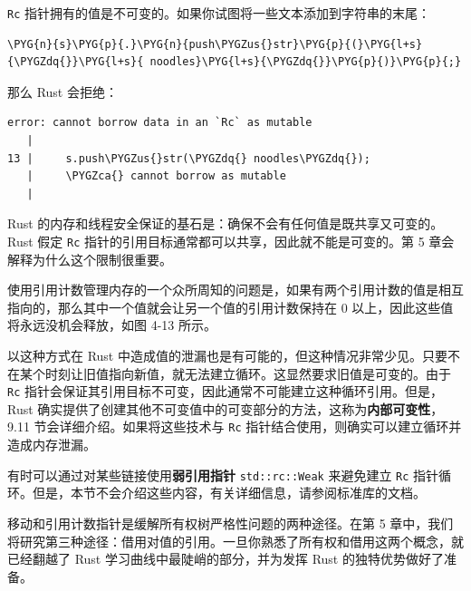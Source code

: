 \texttt{Rc} 指针拥有的值是不可变的。如果你试图将一些文本添加到字符串的末尾：

\begin{Verbatim}[commandchars=\\\{\},breaklines=true,breakanywhere=true,fontsize=\codefont,xleftmargin=17bp]
\PYG{n}{s}\PYG{p}{.}\PYG{n}{push\PYGZus{}str}\PYG{p}{(}\PYG{l+s}{\PYGZdq{}}\PYG{l+s}{ noodles}\PYG{l+s}{\PYGZdq{}}\PYG{p}{)}\PYG{p}{;}
\end{Verbatim}

那么 Rust 会拒绝：

\begin{Verbatim}[commandchars=\\\{\},breaklines=true,breakanywhere=true,fontsize=\codefont,xleftmargin=17bp]
error: cannot borrow data in an `Rc` as mutable
   |
13 |     s.push\PYGZus{}str(\PYGZdq{} noodles\PYGZdq{});
   |     \PYGZca{} cannot borrow as mutable
   |
\end{Verbatim}

Rust 的内存和线程安全保证的基石是：确保不会有任何值是既共享又可变的。Rust 假定 \texttt{Rc} 指针的引用目标通常都可以共享，因此就不能是可变的。第 5 章会解释为什么这个限制很重要。

使用引用计数管理内存的一个众所周知的问题是，如果有两个引用计数的值是相互指向的，那么其中一个值就会让另一个值的引用计数保持在 0 以上，因此这些值将永远没机会释放，如图 4-13 所示。


以这种方式在 Rust 中造成值的泄漏也是有可能的，但这种情况非常少见。只要不在某个时刻让旧值指向新值，就无法建立循环。这显然要求旧值是可变的。由于 \texttt{Rc} 指针会保证其引用目标不可变，因此通常不可能建立这种循环引用。但是，Rust 确实提供了创建其他不可变值中的可变部分的方法，这称为\textbf{内部可变性}，9.11 节会详细介绍。如果将这些技术与 \texttt{Rc} 指针结合使用，则确实可以建立循环并造成内存泄漏。

有时可以通过对某些链接使用\textbf{弱引用指针} \texttt{std::rc::Weak} 来避免建立 \texttt{Rc} 指针循环。但是，本节不会介绍这些内容，有关详细信息，请参阅标准库的文档。

移动和引用计数指针是缓解所有权树严格性问题的两种途径。在第 5 章中，我们将研究第三种途径：借用对值的引用。一旦你熟悉了所有权和借用这两个概念，就已经翻越了 Rust 学习曲线中最陡峭的部分，并为发挥 Rust 的独特优势做好了准备。


